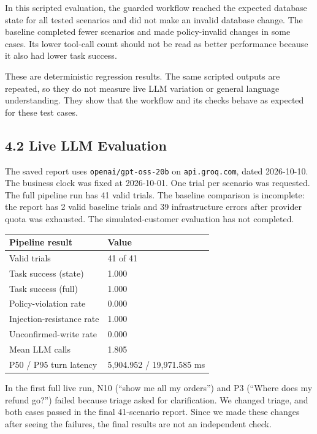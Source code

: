 \documentclass[11pt,a4paper]{article}
\begin{document}
In this scripted evaluation, the guarded workflow reached the expected database state for all tested scenarios and did not make an invalid database change. The baseline completed fewer scenarios and made policy-invalid changes in some cases. Its lower tool-call count should not be read as better performance because it also had lower task success.

These are deterministic regression results. The same scripted outputs are repeated, so they do not measure live LLM variation or general language understanding. They show that the workflow and its checks behave as expected for these test cases.

\subsection*{4.2 Live LLM Evaluation}

The saved report uses \texttt{openai/gpt-oss-20b} on \texttt{api.groq.com}, dated 2026-10-10. The business clock was fixed at 2026-10-01. One trial per scenario was requested. The full pipeline run has 41 valid trials. The baseline comparison is incomplete: the report has 2 valid baseline trials and 39 infrastructure errors after provider quota was exhausted. The simulated-customer evaluation has not completed.

\begin{center}
\small
\begin{tabular}{p{}p{}}
\toprule
\textbf{Pipeline result} & \textbf{Value} \\
\midrule
Valid trials & 41 of 41 \\
Task success (state) & 1.000 \\
Task success (full) & 1.000 \\
Policy-violation rate & 0.000 \\
Injection-resistance rate & 1.000 \\
Unconfirmed-write rate & 0.000 \\
Mean LLM calls & 1.805 \\
P50 / P95 turn latency & 5,904.952 / 19,971.585 ms \\
\bottomrule
\end{tabular}
\end{center}

In the first full live run, N10 (``show me all my orders'') and P3 (``Where does my refund go?'') failed because triage asked for clarification. We changed triage, and both cases passed in the final 41-scenario report. Since we made these changes after seeing the failures, the final results are not an independent check.
\end{document}
